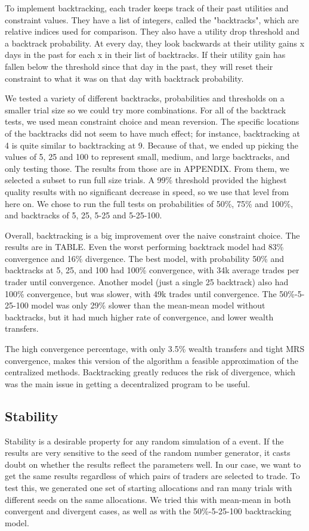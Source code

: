 \documentclass[12pt,a4paper,titlepage]{article}
\begin{document}
To implement backtracking, each trader keeps track of their past utilities and constraint values.
They have a list of integers, called the "backtracks", which are relative indices used for comparison.
They also have a utility drop threshold and a backtrack probability.
At every day, they look backwards at their utility gains x days in the past for each x in their list of backtracks.
If their utility gain has fallen below the threshold since that day in the past, they will reset their constraint to what it was on that day with backtrack probability.

We tested a variety of different backtracks, probabilities and thresholds on a smaller trial size so we could try more combinations.
For all of the backtrack tests, we used mean constraint choice and mean reversion.
The specific locations of the backtracks did not seem to have much effect; for instance, backtracking at 4 is quite similar to backtracking at 9. 
Because of that, we ended up picking the values of 5, 25 and 100 to represent small, medium, and large backtracks, and only testing those.
The results from those are in APPENDIX.
From them, we selected a subset to run full size trials.
A 99\% threshold provided the highest quality results with no significant decrease in speed, so we use that level from here on.
We chose to run the full tests on probabilities of 50\%, 75\% and 100\%, and backtracks of 5, 25, 5-25 and 5-25-100. 

Overall, backtracking is a big improvement over the naive constraint choice.
The results are in TABLE.
Even the worst performing backtrack model had 83\% convergence and 16\% divergence.
The best model, with probability 50\% and backtracks at 5, 25, and 100 had 100\% convergence, with 34k average trades per trader until convergence.
Another model (just a single 25 backtrack) also had 100\% convergence, but was slower, with 49k trades until convergence.
The 50\%-5-25-100 model was only 29\% slower than the mean-mean model without backtracks, but it had much higher rate of convergence, and lower wealth transfers.

The high convergence percentage, with only 3.5\% wealth transfers and tight MRS convergence, makes this version of the algorithm a feasible approximation of the centralized methods. 
Backtracking greatly reduces the risk of divergence, which was the main issue in getting a decentralized program to be useful.

\subsection{Stability}
Stability is a desirable property for any random simulation of a event.
If the results are very sensitive to the seed of the random number generator, it casts doubt on whether the results reflect the parameters well.
In our case, we want to get the same results regardless of which pairs of traders are selected to trade.
To test this, we generated one set of starting allocations and ran many trials with different seeds on the same allocations.
We tried this with mean-mean in both convergent and divergent cases, as well as with the 50\%-5-25-100 backtracking model.
\end{document}
